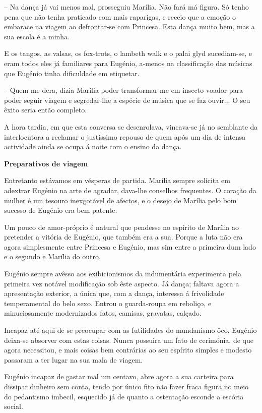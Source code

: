 \documentclass[9pt]{article}
\begin{document}
-- Na dan\-ça já vai menos mal, prosseguiu Marília. Não fará má figura. Só
tenho pena que não tenha praticado com mais raparigas, e receio que a emo\-ção
o embarace na viagem ao defrontar-se com Princesa. Esta dan\-ça muito bem,
mas a sua escola é a minha.

E os tangos, as valsas, os fox-trots, o lambeth walk e o palai glyd
sucediam-se, e eram todos eles já familiares para Eugé\-nio, a-menos na classifi\-ca\-ção das músicas que Eugé\-nio tinha dificuldade em etiquetar.

-- Quem me dera, dizia Marília poder transformar-me em insecto voador
para poder seguir viagem e segredar-\-lhe a espécie de música que se faz
ouvir... O seu êxito seria então completo.

A hora tardia, em que esta conversa se desenrolava, vincava-se já no
semblante da interlocutora a reclamar o justíssimo repouso de quem após
um dia de intensa actividade ainda se ocupa á noite com o ensino da dan\-ça.

\begin{center}\bf\large Preparativos de viagem\end{center}

Entretanto estávamos em vésperas de partida. Marília sempre solí\-cita
em adextrar Eugé\-nio na arte de agradar, dava-\-lhe conse\-lhos frequentes. O cora\-ção da mu\-lher é um tesouro inexgotável de afectos, e o desejo de Marília
pelo bom sucesso de Eugé\-nio era bem patente.

Um pouco de amor-próprio é natural que pendesse no espírito de Marília
ao pretender a vitória de Eugé\-nio, que também era a sua. Porque a luta não
era agora simplesmente entre Princesa e Eugé\-nio, mas sim entre a primeira dum lado e o segundo e Marília do outro.

Eugé\-nio sempre avêsso aos exibicionismos da indumentária experimenta
pela primeira vez notável modifi\-ca\-ção sob êste aspecto. Já dan\-ça; faltava
agora a apresenta\-ção exterior, a única que, com a dan\-ça, interessa á frivolidade temperamental do belo sexo. Entrou o guarda-roupa em reboliço, e minuciosamente modernizados fatos, camisas, gravatas, calçado.

Incapaz até aqui de se preocupar com as futilidades do mundanismo ôco, Eugé\-nio deixa-se absorver com estas coisas. Nunca possuira um fato de cerimónia, de que agora necessitou, e mais coisas bem contrárias ao seu espírito
simples e modesto passaram a ter lugar na sua mala de viagem.

Eugé\-nio incapaz de gastar mal um centavo, abre agora a sua carteira
para dissipar dinheiro sem conta, tendo por único fito não fazer fraca figura no meio do pedantismo imbecil, esquecido já de quanto a ostenta\-ção esconde a escória social.
\end{document}
